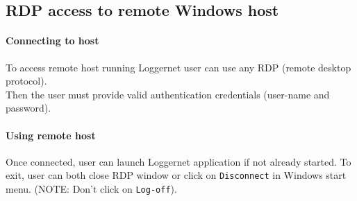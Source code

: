 \subsection{RDP access to remote Windows host}
\label{subsec:rdp}
\paragraph{Connecting to host}
To access remote host running Loggernet user can use any RDP (remote desktop protocol).\\Then the user must provide valid authentication credentials (user-name and password).
\paragraph{Using remote host}
Once connected, user can launch Loggernet application if not already started. To exit, user can both close RDP window or click on {\tt Disconnect} in Windows start menu. (NOTE: Don't click on {\tt Log-off}).